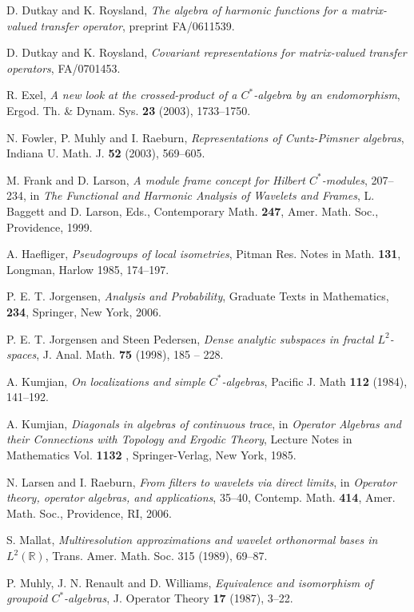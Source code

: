 \documentclass{amsproc}
\theoremstyle{plain}
\theoremstyle{definition}
\theoremstyle{definition}
\theoremstyle{remark}
\theoremstyle{plain}
\begin{document}
\begin{thebibliography}{10}
D. Dutkay and K. Roysland, \emph{The algebra of harmonic
functions for a matrix-valued transfer operator}, preprint FA/0611539.

D. Dutkay and K. Roysland, \emph{Covariant representations
for matrix-valued transfer operators}, FA/0701453.

R. Exel, \emph{A new look at the crossed-product of
a $C^{*}$-algebra by an endomorphism}, Ergod. Th. \& Dynam. Sys.
\textbf{23} (2003), 1733--1750.

N. Fowler, P. Muhly and I. Raeburn, \emph{Representations
of Cuntz-Pimsner algebras}, Indiana U. Math. J. \textbf{52} (2003),
569--605.

M. Frank and D. Larson, \emph{A module frame concept
for Hilbert $C^{*}$-modules}, 207--234, in \emph{The Functional and
Harmonic Analysis of Wavelets and Frames}, L. Baggett and D. Larson,
Eds., Contemporary Math. \textbf{247}, Amer. Math. Soc., Providence,
1999.

A. Haefliger, \emph{Pseudogroups of local isometries},
Pitman Res. Notes in Math. \textbf{131}, Longman, Harlow 1985, 174--197.

P. E. T. Jorgensen, \emph{Analysis and Probability},
Graduate Texts in Mathematics, \textbf{234}, Springer, New York, 2006.

P. E. T. Jorgensen and Steen Pedersen, \emph{Dense
analytic subspaces in fractal $L^{2}$-spaces}, J. Anal. Math. \textbf{75}
(1998), 185 -- 228.

A. Kumjian, \emph{On localizations and simple $C^{*}$-algebras},
Pacific J. Math \textbf{112} (1984), 141--192.

A. Kumjian, \emph{Diagonals in algebras of continuous
trace}, in \emph{Operator Algebras and their Connections with Topology
and Ergodic Theory}, Lecture Notes in Mathematics Vol. \textbf{1132}
, Springer-Verlag, New York, 1985.

N. Larsen and I. Raeburn, \emph{From filters to wavelets
via direct limits}, in \emph{Operator theory, operator algebras, and
applications}, 35--40, Contemp. Math. \textbf{414}, Amer. Math. Soc.,
Providence, RI, 2006.

S. Mallat, \emph{Multiresolution approximations and
wavelet orthonormal bases in} $L^{2}(\mathbb{R})$, Trans. Amer. Math.
Soc. 315 (1989), 69--87.

P. Muhly, J. N. Renault and D. Williams, \emph{Equivalence
and isomorphism of groupoid $C^{*}$-algebras}, J. Operator Theory
\textbf{17} (1987), 3--22.


\end{thebibliography}
\end{document}
